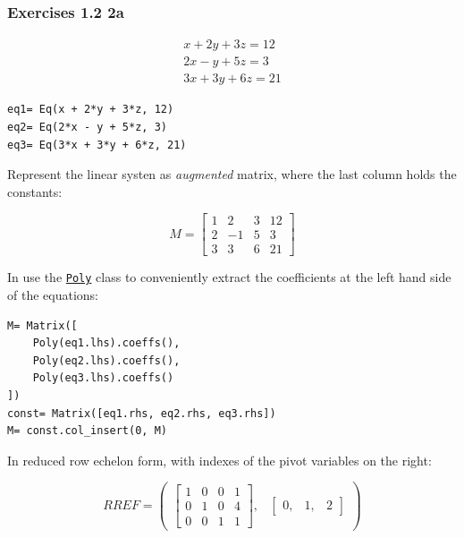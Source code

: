 \subsubsection{Exercises 1.2 2a}

\begin{equation}
\begin{matrix}x + 2 y + 3 z = 12\\2 x - y + 5 z = 3\\3 x + 3 y + 6 z = 21\end{matrix}
\end{equation}

\begin{verbatim}
eq1= Eq(x + 2*y + 3*z, 12)
eq2= Eq(2*x - y + 5*z, 3)
eq3= Eq(3*x + 3*y + 6*z, 21)
\end{verbatim}

Represent the linear systen as \textit{augmented} matrix, where the last column
holds the constants:

\begin{equation}
M= \left[\begin{matrix}1 & 2 & 3 & \textit{12}\\
                       2 & -1 & 5 & \textit{3}\\
                       3 & 3 & 6 & \textit{21}\end{matrix}\right]
\end{equation}

In \sympy use the \href{http://docs.sympy.org/latest/modules/polys/reference.html#sympy.polys.polytools.Poly}{\texttt{Poly}}
class to conveniently extract the coefficients at the left hand side of
the equations:

\begin{verbatim}
M= Matrix([
    Poly(eq1.lhs).coeffs(),
    Poly(eq2.lhs).coeffs(),
    Poly(eq3.lhs).coeffs()
])
const= Matrix([eq1.rhs, eq2.rhs, eq3.rhs])
M= const.col_insert(0, M)
\end{verbatim}

In reduced row echelon form, with indexes of the pivot variables on the right:

\begin{equation}
RREF= \begin{pmatrix}\left[\begin{matrix}1 & 0 & 0 & 1\\0 & 1 & 0 & 4\\0 & 0 & 1 & 1\end{matrix}\right], & \begin{bmatrix}0, & 1, & 2\end{bmatrix}\end{pmatrix}
\end{equation}

